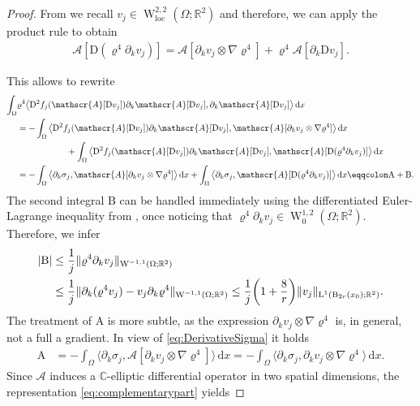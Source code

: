 \documentclass[a4paper,10pt,reqno,oneside]{amsart}
\numberwithin{equation}{section}
\newcommand{\R}{\mathbb R}
\newcommand{\ball}{\mathrm{B}}
\newcommand{\A}{\mathscr{A}}
\newcommand{\lebe}{\operatorname{L}}
\newcommand{\sobo}{\operatorname{W}}
\newcommand{\loc}{\mathrm{loc}}
\newcommand{\D}{\mathrm{D}}
\newcommand{\intd}{\,\mathrm{d}}
\newcommand{\dx}[1]{\,\mathrm{d}#1}
\newcommand{\del}{\partial}
\newcommand{\skalarProd}[2]{\big\langle#1,#2\big\rangle}
\newcommand{\abs}[1]{\left\lvert#1\right\rvert}
\begin{document}
\begin{proof} From  we recall $v_j\in \sobo^{2,2}_{\loc}(\Omega;\R^2)$ and therefore, we can apply the product rule to obtain
	\begin{align*}
		\A[\D (\varrho^4 \del_k v_j)] = \A[\del_k v_j\otimes \nabla \varrho^4]+ \varrho^4 \A[\del_k \D v_j].
	\end{align*}


	\pagebreak \noindent This allows to rewrite 
	\begin{align}\label{eq:A+B}
		\int_\Omega &\varrho^4\skalarProd{\D^2 f_j(\A[\D v_j])\del_k \A[\D v_j]}{\partial_k\A[\D v_j]}\intd x\notag \\
		&= -\int_\Omega \skalarProd{\D^2 f_j(\A[\D v_j])\del_k \A[\D v_j]}{\A[\del_k v_j \otimes \nabla \varrho^4]}\intd x \notag \\
		&\hspace{2cm} +\int_\Omega \skalarProd{\D^2 f_j (\A[\D v_j])\del_k \A[\D v_j]}{ \A[\D(\varrho^4\del_k v_j)]}\dx{x}\notag \\
		&=-\int_{\Omega}\skalarProd{\partial_k\sigma_j}{\A[\del_k v_j \otimes \nabla \varrho^4]}\intd x+\int_{\Omega}\skalarProd{\partial_k\sigma_j}{\A[\D(\varrho^4\del_k v_j)]}\dx{x}\eqqcolon \mathrm{A} + \mathrm{B}.  
	\end{align}
	The second integral $\mathrm{B}$ can be handled immediately using the differentiated Euler-Lagrange inequality from , once noticing that $\varrho^4 \del_k v_j\in \sobo^{1,2}_0(\Omega;\R^2)$. Therefore, we infer  
	\begin{align}\label{eq:estimateB}
		\abs{\mathrm{B}}
		&\leq \frac{1}{j}\|\varrho^4 \del_k v_j \|_{\sobo^{-1,1}(\Omega;\R^2)}\notag \\
		&\leq \frac{1}{j}\| \del_k (\varrho^4 v_j) -v_j \del_k \varrho^4\|_{\sobo^{-1,1}(\Omega;\R^2)}
		\leq \frac{1}{j} \bigg(1+\frac{8}{r}\bigg)\|v_j\|_{\lebe^1(\ball_{2r}(x_0);\R^2)}. 
	\end{align}
		The treatment of $\mathrm{A}$ is more subtle, as the expression $\del_k v_j \otimes \nabla \varrho^4$ is, in general, not a full a gradient. In view of \eqref{eq:DerivativeSigma} it holds
	\begin{align*}
		\mathrm{A} &= -\int_\Omega \skalarProd{\del_k \sigma_j}{\A[\del_k v_j\otimes \nabla \varrho^4]}\dx{x}
		=-\int_\Omega \skalarProd{\del_k \sigma_j}{\del_k v_j\otimes \nabla \varrho^4}\dx{x}.
	\end{align*}
Since $\A$ induces a $\mathbb{C}$-elliptic differential operator in two spatial dimensions, the representation \eqref{eq:complementarypart} yields

\end{proof}
\end{document}
